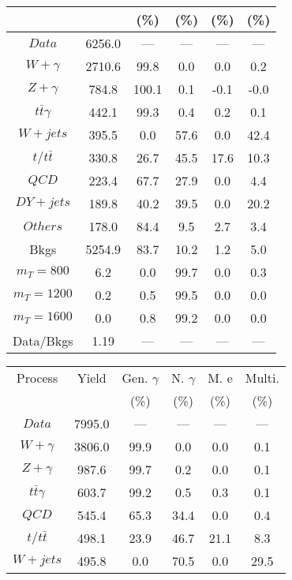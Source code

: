 \begin{figure}
\begin{minipage}[c]{0.32\textwidth}
{\begin{tabular}{cccccc}
 &  & (\%) & (\%) & (\%) & (\%)  \\
\hline
                                                                      $ Data $ &  6256.0 &  --- &  --- &  --- &  ---\\
$ W+\gamma $ &  2710.6 &  99.8 &  0.0 &  0.0 &  0.2\\
$ Z+\gamma $ &  784.8 &  100.1 &  0.1 &  -0.1 &  -0.0\\
$ t\bar{t}\gamma $ &  442.1 &  99.3 &  0.4 &  0.2 &  0.1\\
$ W+jets $ &  395.5 &  0.0 &  57.6 &  0.0 &  42.4\\
$ t/t\bar{t} $ &  330.8 &  26.7 &  45.5 &  17.6 &  10.3\\
$ QCD $ &  223.4 &  67.7 &  27.9 &  0.0 &  4.4\\
$ DY+jets $ &  189.8 &  40.2 &  39.5 &  0.0 &  20.2\\
$ Others $ &  178.0 &  84.4 &  9.5 &  2.7 &  3.4\\
Bkgs &  5254.9 &  83.7 &  10.2 &  1.2 &  5.0\\
$ m_{T} = 800 $ &  6.2 &  0.0 &  99.7 &  0.0 &  0.3\\
$ m_{T} = 1200 $ &  0.2 &  0.5 &  99.5 &  0.0 &  0.0\\
$ m_{T} = 1600 $ &  0.0 &  0.8 &  99.2 &  0.0 &  0.0\\
Data/Bkgs &  1.19 &  --- &  --- &  --- &  ---\\
\hline
\end{tabular}
}
\end{minipage}
\begin{minipage}[c]{0.32\textwidth}
\centering
\tiny{
\begin{tabular}{cccccc}
\hline
Process & Yield & Gen. $\gamma$ & N. $\gamma$ & M. e & Multi. \\
 &  & (\%) & (\%) & (\%) & (\%)  \\
\hline
                                                                      $ Data $ &  7995.0 &  --- &  --- &  --- &  ---\\
$ W+\gamma $ &  3806.0 &  99.9 &  0.0 &  0.0 &  0.1\\
$ Z+\gamma $ &  987.6 &  99.7 &  0.2 &  0.0 &  0.1\\
$ t\bar{t}\gamma $ &  603.7 &  99.2 &  0.5 &  0.3 &  0.1\\
$ QCD $ &  545.4 &  65.3 &  34.4 &  0.0 &  0.4\\
$ t/t\bar{t} $ &  498.1 &  23.9 &  46.7 &  21.1 &  8.3\\
$ W+jets $ &  495.8 &  0.0 &  70.5 &  0.0 &  29.5\\

\end{tabular}}
\end{minipage}
\end{figure}
